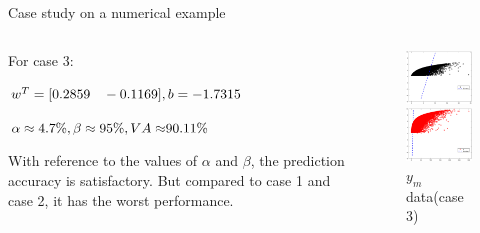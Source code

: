 \documentclass[10pt]{beamer}
\begin{document}
\begin{frame}{Case study on a numerical example}
 \begin{columns}
             \begin{column}{0.5\textwidth}
    For case 3: \par
     $\small{w^T = [0.2859 \quad -0.1169]
 , b =-1.7315 } $\par $\small{\alpha  \approx 4.7\%,\beta  \approx 95 \% ,VA \approx}90.11 \% $ \par 
 With reference to the values of $\alpha$ and $\beta$, the prediction accuracy is satisfactory. But compared to case 1 and case 2, it has the worst performance.
           \end{column}
        \begin{column}{0.4\textwidth}  %
   \begin{figure}
        \centering
        \includegraphics[width=4cm]{fig/EAandhyper.eps}
        \caption{$y_n$ data(case 3)}
        \includegraphics[width=4cm]{fig/EMandhyper.eps}
        \caption{ $y_{m}$ data(case 3)}
        \end{figure}
        \end{column}
    \end{columns}    
\end{frame}
\end{document}
